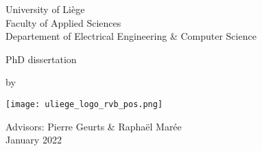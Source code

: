 \makeatletter

\begin{titlepage}
  \begin{center}
    University of Liège \\
    Faculty of Applied Sciences \\
    Departement of Electrical Engineering \& Computer Science

    \vfill 

    PhD dissertation 

    \vspace{1em}

    {
      \Huge
      \@title
    }


    \vspace{1em}

    by \@author

    \vfill


    \begin{minipage}{0.4\linewidth}
      \texttt{[image: uliege\_logo\_rvb\_pos.png]}
    \end{minipage}
    \begin{minipage}{0.55\linewidth}
      \begin{flushright}
        Advisors: Pierre Geurts \& Raphaël Marée \\
        January 2022
      \end{flushright}
    \end{minipage}

  \end{center}
\end{titlepage}

\makeatother
